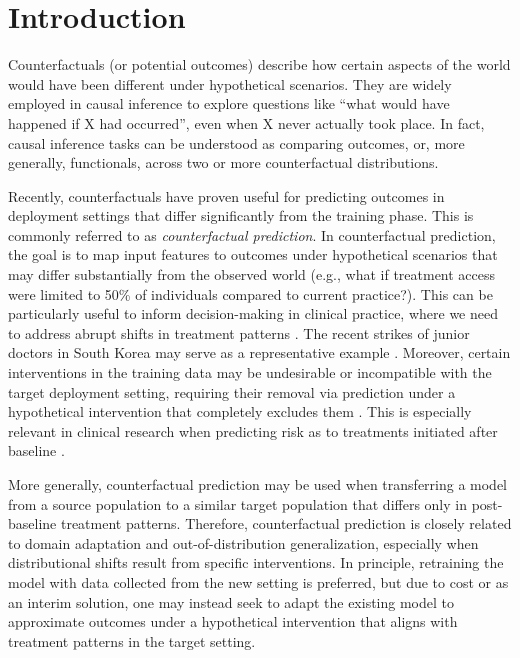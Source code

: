 \section{Introduction}
\label{sec:intro}

Counterfactuals (or potential outcomes) describe how certain aspects of the world would have been different under hypothetical scenarios. They are widely employed in causal inference to explore questions like “what would have happened if X had occurred”, even when X never actually took place. In fact, causal inference tasks can be understood as comparing outcomes, or, more generally, functionals, across two or more counterfactual distributions.

Recently, counterfactuals have proven useful for predicting outcomes in deployment settings that differ significantly from the training phase. This is commonly referred to as \textit{counterfactual prediction}. In counterfactual prediction, the goal is to map input features to outcomes under hypothetical scenarios that may differ substantially from the observed world (e.g., what if treatment access were limited to 50\% of individuals compared to current practice?). This can be particularly useful to inform decision-making in clinical practice, where we need to address abrupt shifts in treatment patterns \citep[e.g.,][]{hernan2019second, dickerman2020counterfactual, van2020prediction, dickerman2022predicting}. The recent strikes of junior doctors in South Korea may serve as a representative example \citep{pacific2024junior, park2024junior}. Moreover, certain interventions in the training data may be undesirable or incompatible with the target deployment setting, requiring their removal via prediction under a hypothetical intervention that completely excludes them \citep[e.g.,][]{sperrin2018using}. This is especially relevant in clinical research when predicting risk as to treatments initiated after baseline \citep{schulam2017reliable, van2020prediction, lin2021scoping}. 

More generally, counterfactual prediction may be used when transferring a model from a source population to a similar target population that differs only in post-baseline treatment patterns. Therefore, counterfactual prediction is closely related to domain adaptation and out-of-distribution generalization, especially when distributional shifts result from specific interventions. In principle, retraining the model with data collected from the new setting is preferred, but due to cost or as an interim solution, one may instead seek to adapt the existing model to approximate outcomes under a hypothetical intervention that aligns with treatment patterns in the target setting.

